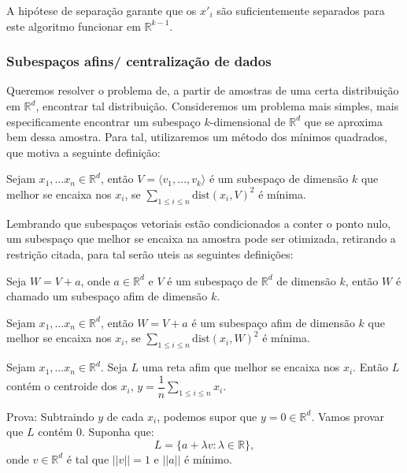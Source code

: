 A hip\'otese de separa\c{c}\~ao garante que os $x'_i$ s\~ao suficientemente separados para este algoritmo funcionar em $\mathbb{R}^{k-1}$.

\subsubsection{Subespa\c{c}os afins/ centraliza\c{c}\~ao de dados}
Queremos resolver o problema de, a partir de amostras de uma certa distribui\c{c}\~ao em $\mathbb{R}^d$, encontrar tal distribui\c{c}\~ao. Consideremos um problema mais simples, mais especificamente encontrar um subespa\c{c}o $k$-dimensional de $\mathbb{R}^d$ que se aproxima bem dessa amostra. Para tal, utilizaremos um m\'etodo dos m\'inimos quadrados, que motiva a seguinte defini\c{c}\~ao:

\begin{definicao}
Sejam $x_1,\dots x_n \in \mathbb{R}^d$, ent\~ao $V = \langle v_1,\dots,v_k\rangle$ \'e um subespa\c{c}o de dimens\~ao $k$ que melhor se encaixa nos $x_i$, se $\displaystyle\sum _{1 \le i \le n} \text{dist}(x_i,V)^2$ \'e m\'inima.
\end{definicao}

Lembrando que subespa\c{c}os vetoriais est\~ao condicionados a conter o ponto nulo, um subespa\c{c}o que melhor se encaixa na amostra pode ser otimizada, retirando a restri\c{c}\~ao citada, para tal ser\~ao uteis as seguintes defini\c{c}\~oes:

\begin{definicao}
Seja $W = V + a$, onde $a\in \mathbb{R}^d$ e $V$ \'e um subespa\c{c}o de $\mathbb{R}^d$ de dimens\~ao $k$, ent\~ao $W$ \'e chamado um subespa\c{c}o afim de dimens\~ao $k$.
\end{definicao}

\begin{definicao}
Sejam $x_1,\dots x_n \in \mathbb{R}^d$, ent\~ao $W = V+a $ \'e um subespa\c{c}o afim de dimens\~ao $k$ que melhor se encaixa nos $x_i$, se $\displaystyle\sum _{1 \le i \le n} \text{dist}(x_i,W)^2$ \'e m\'inima.
\end{definicao}

\begin{proposicao} 
Sejam $x_1,\dots x_n \in \mathbb{R}^d$. Seja $L$ uma reta afim que melhor se encaixa nos $x_i$. Ent\~ao $L$ cont\'em o centroide dos $x_i$, $y = \dfrac{1}{n} \displaystyle\sum_{1\le i\le n} x_i$.
\end{proposicao}
Prova: Subtraindo $y$ de cada $x_i$, podemos supor que $y=0\in \mathbb{R}^d$. Vamos provar que $L$ cont\'em $0$. Suponha que:
\[L = \{ a + \lambda v: \lambda \in \mathbb{R}\},\]
onde $v \in \mathbb{R}^d$ \'e tal que $\vert\vert v \vert \vert = 1$ e $\vert\vert a \vert \vert$ \'e m\'inimo.

